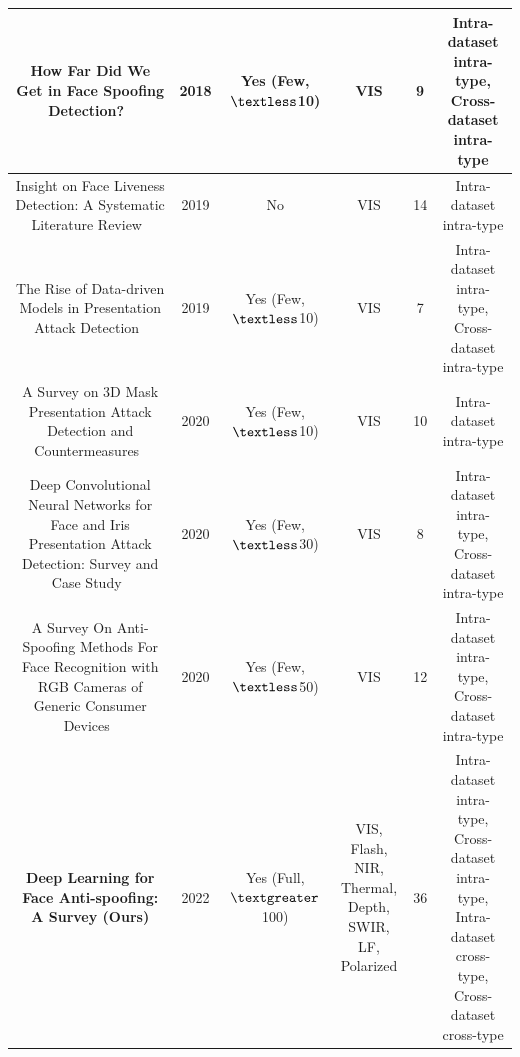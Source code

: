 \documentclass[10pt,journal,compsoc]{IEEEtran}
\begin{document}
\begin{table}
{\begin{tabular}{c c c c c c}
  \midrule
 How Far Did We Get in Face Spoofing Detection?~\cite{souza2018far} & 2018 & \tabincell{c}{Yes\\(Few, $\textless$10)} & VIS  & 9 & \tabincell{c}{Intra-dataset intra-type,\\Cross-dataset intra-type}\\

  \midrule
 Insight on Face Liveness Detection: A Systematic Literature Review~\cite{raheem2019insight} & 2019 & No & VIS  & 14 & Intra-dataset intra-type\\

  \midrule
 The Rise of Data-driven Models in Presentation Attack Detection~\cite{pereira2020rise} & 2019 & \tabincell{c}{Yes\\(Few, $\textless$10)} & VIS  & 7 & \tabincell{c}{Intra-dataset intra-type,\\Cross-dataset intra-type}\\ 

  \midrule
 A Survey on 3D Mask Presentation Attack Detection and Countermeasures~\cite{jia2020survey} & 2020 & \tabincell{c}{Yes\\(Few, $\textless$10)} & VIS  & 10 & Intra-dataset intra-type\\

  \midrule
 \tabincell{c}{Deep Convolutional Neural Networks for Face and Iris Presentation Attack \\Detection: Survey and Case Study}~\cite{el2020deep} & 2020 & \tabincell{c}{Yes\\(Few, $\textless$30)} & VIS  & 8 & \tabincell{c}{Intra-dataset intra-type,\\Cross-dataset intra-type}\\ 


 \midrule
 \tabincell{c}{A Survey On Anti-Spoofing Methods For Face Recognition with\\ RGB Cameras of Generic Consumer Devices}~\cite{ming2020survey} & 2020 & \tabincell{c}{Yes\\(Few, $\textless$50)} & VIS  & 12 & \tabincell{c}{Intra-dataset intra-type,\\Cross-dataset intra-type}\\ 


  \midrule
 \textbf{Deep Learning for Face Anti-spoofing: A Survey (Ours)} & 2022 & \tabincell{c}{Yes\\(Full, $\textgreater$100)} & \tabincell{c}{VIS, Flash,\\NIR, Thermal, \\Depth, SWIR, \\LF, Polarized}  & 36 & \tabincell{c}{Intra-dataset intra-type,\\Cross-dataset intra-type,\\Intra-dataset cross-type,\\Cross-dataset cross-type}\\ 

 \bottomrule[1pt]
 \end{tabular}}
\end{table}
\end{document}
